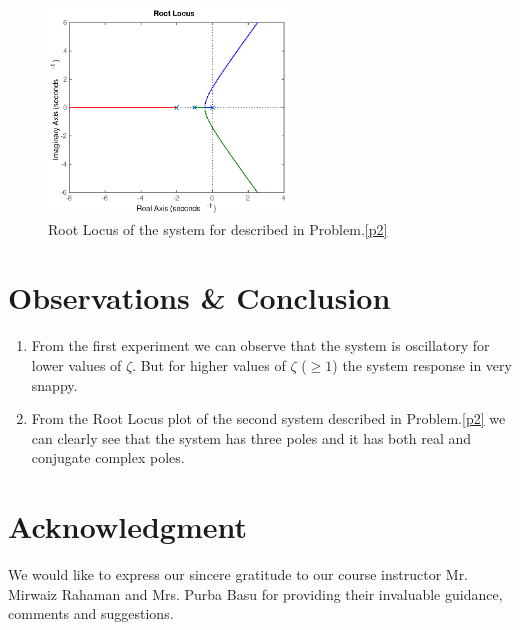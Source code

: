 \documentclass[12pt,conference,a4paper,twocolumn]{IEEEtran}
\begin{document}
\begin{figure}[h!]
\centering
\includegraphics[width=2.5in]{rl.eps}
\caption{Root Locus of the system for described in Problem.\ref{p2}}
\end{figure}


\newpage

\section{Observations \& Conclusion}
\begin{enumerate}
\item From the first experiment we can observe that the system is oscillatory for lower values of $\zeta$. But for higher values of $\zeta$ ($\geq 1$) the system response in very snappy.
\item From the Root Locus plot of the second system described in Problem.\ref{p2} we can clearly see that the system has three poles and it has both real and conjugate complex poles.
\end{enumerate}

\section{Acknowledgment}
We would like to express our sincere gratitude to our course instructor Mr. Mirwaiz Rahaman and Mrs. Purba Basu for providing their invaluable guidance, comments and suggestions.
\end{document}
